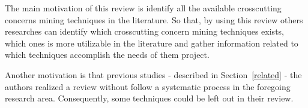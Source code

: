 The main motivation of this review is identify all the available crosscutting concerns mining techniques in the literature. So that, by using this review others researches can identify which crosscutting concern mining techniques exists, which ones is more utilizable in the literature and gather information related to which techniques accomplish the needs of them project.

Another motivation is that previous studies - described in Section~\ref{related} - the authors realized a review without follow a systematic process in the foregoing research area. Consequently, some techniques could be left out in their review.